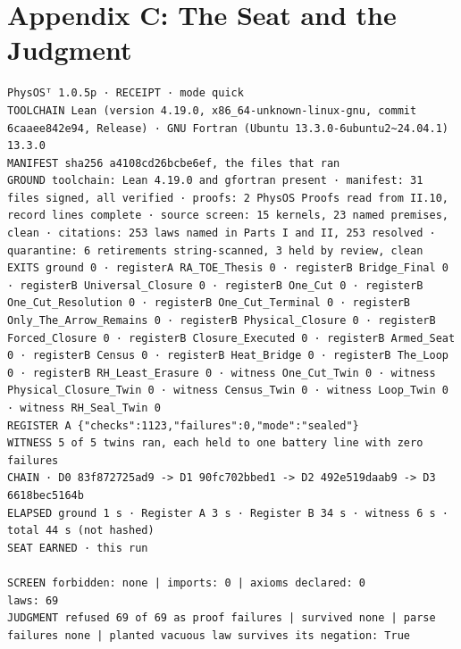 \documentclass[10pt]{article}
\begin{document}
\hypertarget{appendix-c-the-seat-and-the-judgment}{%
\section{Appendix C: The Seat and the
Judgment}\label{appendix-c-the-seat-and-the-judgment}}

\begin{Verbatim}[fontsize=\fontsize{6.0}{7.0}\selectfont,breaklines,breakanywhere,breaksymbolleft={}]
PhysOSᵀ 1.0.5p · RECEIPT · mode quick
TOOLCHAIN Lean (version 4.19.0, x86_64-unknown-linux-gnu, commit 6caaee842e94, Release) · GNU Fortran (Ubuntu 13.3.0-6ubuntu2~24.04.1) 13.3.0
MANIFEST sha256 a4108cd26bcbe6ef, the files that ran
GROUND toolchain: Lean 4.19.0 and gfortran present · manifest: 31 files signed, all verified · proofs: 2 PhysOS Proofs read from II.10, record lines complete · source screen: 15 kernels, 23 named premises, clean · citations: 253 laws named in Parts I and II, 253 resolved · quarantine: 6 retirements string-scanned, 3 held by review, clean
EXITS ground 0 · registerA RA_TOE_Thesis 0 · registerB Bridge_Final 0 · registerB Universal_Closure 0 · registerB One_Cut 0 · registerB One_Cut_Resolution 0 · registerB One_Cut_Terminal 0 · registerB Only_The_Arrow_Remains 0 · registerB Physical_Closure 0 · registerB Forced_Closure 0 · registerB Closure_Executed 0 · registerB Armed_Seat 0 · registerB Census 0 · registerB Heat_Bridge 0 · registerB The_Loop 0 · registerB RH_Least_Erasure 0 · witness One_Cut_Twin 0 · witness Physical_Closure_Twin 0 · witness Census_Twin 0 · witness Loop_Twin 0 · witness RH_Seal_Twin 0
REGISTER A {"checks":1123,"failures":0,"mode":"sealed"}
WITNESS 5 of 5 twins ran, each held to one battery line with zero failures
CHAIN · D0 83f872725ad9 -> D1 90fc702bbed1 -> D2 492e519daab9 -> D3 6618bec5164b
ELAPSED ground 1 s · Register A 3 s · Register B 34 s · witness 6 s · total 44 s (not hashed)
SEAT EARNED · this run

SCREEN forbidden: none | imports: 0 | axioms declared: 0
laws: 69
JUDGMENT refused 69 of 69 as proof failures | survived none | parse failures none | planted vacuous law survives its negation: True
\end{Verbatim}
\end{document}
